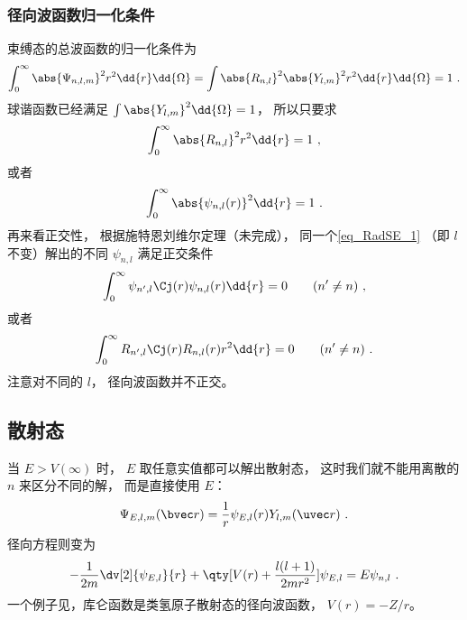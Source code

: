 \subsubsection{径向波函数归一化条件}
束缚态的总波函数的归一化条件为
\begin{equation}
\int_0^\infty \abs{\Psi_{n,l,m}}^2 r^2\dd{r} \dd{\Omega} = \int \abs{R_{n,l}}^2 \abs{Y_{l,m}}^2 r^2\dd{r} \dd{\Omega}  = 1~.
\end{equation}
球谐函数已经满足 $\int \abs{Y_{l,m}}^2 \dd{\Omega} = 1$，  所以只要求
\begin{equation}\label{eq_RadSE_5}
\int_0^\infty \abs{R_{n,l}}^2 r^2 \dd{r}  = 1~,
\end{equation}
或者
\begin{equation}
\int_0^\infty \abs{\psi_{n,l}(r)}^2 \dd{r}  = 1~.
\end{equation}
再来看正交性， 根据施特恩刘维尔定理（未完成）， 同一个\autoref{eq_RadSE_1} （即 $l$ 不变）解出的不同 $\psi_{n,l}$ 满足正交条件
\begin{equation}
\int_0^\infty \psi_{n', l}\Cj(r) \psi_{n,l}(r) \dd{r} = 0 \qquad (n' \ne n)~,
\end{equation}
或者
\begin{equation}\label{eq_RadSE_7}
\int_0^\infty R_{n', l}\Cj(r) R_{n,l}(r) r^2 \dd{r} = 0 \qquad (n' \ne n)~.
\end{equation}
注意对不同的 $l$， 径向波函数并不正交。

\subsection{散射态}
当 $E > V(\infty)$ 时， $E$ 取任意实值都可以解出散射态， 这时我们就不能用离散的 $n$ 来区分不同的解， 而是直接使用 $E$：
\begin{equation}
\Psi_{E, l,m}(\bvec r) = \frac{1}{r}\psi_{E, l}(r) Y_{l,m}(\uvec r)~.
\end{equation}
径向方程则变为
\begin{equation}
-\frac{1}{2m} \dv[2]{\psi_{E, l}}{r} + \qty[V(r) + \frac{l(l + 1)}{2mr^2}]\psi_{E, l} = E \psi_{n, l}~.
\end{equation}
一个例子见，库仑函数是类氢原子散射态的径向波函数， $V(r) = -Z/r$。

